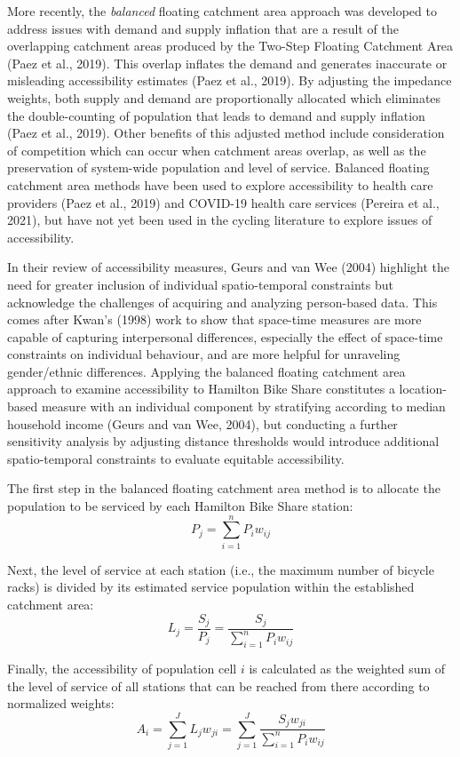 \documentclass[]{elsarticle} %
\begin{document}
More recently, the \emph{balanced} floating catchment area approach was
developed to address issues with demand and supply inflation that are a
result of the overlapping catchment areas produced by the Two-Step
Floating Catchment Area (Paez et al., 2019). This overlap inflates the
demand and generates inaccurate or misleading accessibility estimates
(Paez et al., 2019). By adjusting the impedance weights, both supply and
demand are proportionally allocated which eliminates the double-counting
of population that leads to demand and supply inflation (Paez et al.,
2019). Other benefits of this adjusted method include consideration of
competition which can occur when catchment areas overlap, as well as the
preservation of system-wide population and level of service. Balanced
floating catchment area methods have been used to explore accessibility
to health care providers (Paez et al., 2019) and COVID-19 health care
services (Pereira et al., 2021), but have not yet been used in the
cycling literature to explore issues of accessibility.

In their review of accessibility measures, Geurs and van Wee (2004)
highlight the need for greater inclusion of individual spatio-temporal
constraints but acknowledge the challenges of acquiring and analyzing
person-based data. This comes after Kwan's (1998) work to show that
space-time measures are more capable of capturing interpersonal
differences, especially the effect of space-time constraints on
individual behaviour, and are more helpful for unraveling gender/ethnic
differences. Applying the balanced floating catchment area approach to
examine accessibility to Hamilton Bike Share constitutes a
location-based measure with an individual component by stratifying
according to median household income (Geurs and van Wee, 2004), but
conducting a further sensitivity analysis by adjusting distance
thresholds would introduce additional spatio-temporal constraints to
evaluate equitable accessibility.

The first step in the balanced floating catchment area method is to
allocate the population to be serviced by each Hamilton Bike Share
station: \[
P_j = {\sum_{i = 1}^{n} P_i{w_{ij}}}
\]

Next, the level of service at each station (i.e., the maximum number of
bicycle racks) is divided by its estimated service population within the
established catchment area: \[
L_j = \frac {S_j}{P_j} = \frac {S_j}{{\sum_{i = 1}^{n} P_i{w_{ij}}}}
\]

Finally, the accessibility of population cell \(i\) is calculated as the
weighted sum of the level of service of all stations that can be reached
from there according to normalized weights: \[
A_i = {\sum_{j = 1}^{J} L_j{w_{ji}}} = {\sum_{j = 1}^{J} \frac {S_j{w_{ji}}}{\sum_{i = 1}^{n} P_i{w_{ij}}}}
\]
\end{document}
